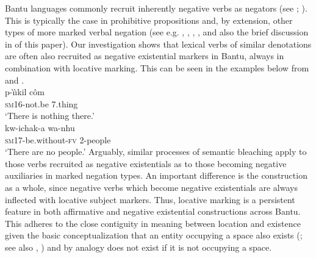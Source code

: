 \documentclass[output=paper]{langscibook}
\begin{document}
Bantu languages commonly recruit inherently negative verbs as negators (see \citealt{Givon1973}; \citeyear[382--383]{Givon2001}). This is typically the case in prohibitive propositions and, by extension, other types of more marked verbal negation (see e.g. \citealt{Bernander2018}, \citealt{DevosOlmen2013}, 
\citealt{Guldemann1999}, \citealt[191--193]{Nurse2008}, and also the brief discussion in  of this paper). Our investigation shows that lexical verbs of similar denotations are often also recruited as negative existential markers in Bantu, always in combination with locative marking. This can be seen in the examples below from  and .
\ea\label{ex:ruwund-nothing}
\\
\gll p-{\`\i}{\`\i}kil c{\^o}m\\
	\textsc{sm}16-not.be 7.thing \\
\glt `There is nothing there.'
\z
\ea\label{ex:kagulu-people}
\\
\gll kw-ichak-a wa-nhu\\
	\textsc{sm}17-be.without-\textsc{fv} 2-people\\
\glt `There are no people.'
\z
Arguably, similar processes of semantic bleaching apply to those verbs
recruited as negative existentials as to those becoming negative
auxiliaries in marked negation types. An important difference is the
construction as a whole, since negative verbs which become negative existentials are always inflected with locative subject markers. Thus, locative marking is a persistent feature in both affirmative and negative existential constructions across Bantu. This adheres to the close contiguity in meaning between location and existence given the basic conceptualization that an entity occupying a space also exists (\citealt[407]{Lakoff1987}; see also \citealt{Gaeta2013}, \citealt{Koch2012}) and by analogy does not exist if it is not occupying a space.
\end{document}
